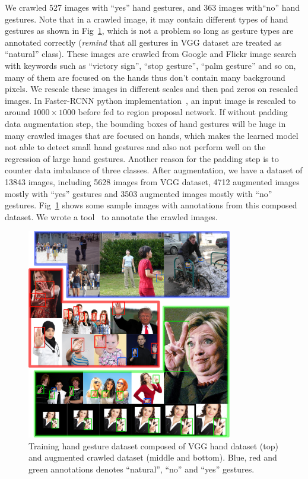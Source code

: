 We crawled 527 images with ``yes'' hand gestures, and 363 images with``no'' hand gestures. Note that in a crawled image, it may contain different types of hand gestures as shown in Fig~\ref{fig:ch4-gesturedataset}, which is not a problem so long as gesture types are annotated correctly (\emph{remind} that all gestures in VGG dataset are treated as ``natural'' class). These images are crawled from Google and Flickr image search with keywords such as ``victory sign'', ``stop gesture'', ``palm gesture'' and so on, many of them are focused on the hands thus don't contain many background pixels. We rescale these images in different scales and then pad zeros on rescaled images. In Faster-RCNN python implementation~\cite{links:pyfasterrcnn}, an input image is rescaled to around $1000\times 1000$ before fed to region proposal network. If without padding data augmentation step, the bounding boxes of hand gestures will be huge in many crawled images that are focused on hands, which makes the learned model not able to detect small hand gestures and also not perform well on the regression of large hand gestures. Another reason for the padding step is to counter data imbalance of three classes. After augmentation, we have a dataset of 13843 images, including 5628 images from VGG dataset, 4712 augmented images mostly with ``yes'' gestures and 3503 augmented images mostly with ``no'' gestures. Fig~\ref{fig:ch4-gesturedataset} shows some sample images with annotations from this composed dataset. We wrote a tool~\cite{links:imgannota} to annotate the crawled images.

\begin{figure}[!htbp]
    \centering
    \includegraphics[width=0.8\textwidth]{figure/ch4-gesturedataset.png}
    \caption{Training hand gesture dataset composed of VGG hand dataset (top) and augmented crawled dataset (middle and bottom). Blue, red and green annotations denotes ``natural'', ``no'' and ``yes'' gestures.}
    \label{fig:ch4-gesturedataset}
\end{figure}

